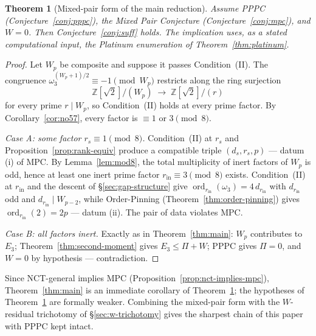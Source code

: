 \documentclass[11pt]{amsart}
\theoremstyle{plain}
\newtheorem{theorem}{Theorem}[section]
\theoremstyle{definition}
\theoremstyle{remark}
\numberwithin{equation}{section}
\newcommand{\ord}{\operatorname{ord}}
\newcommand{\Z}{\mathbb{Z}}
\begin{document}
\begin{theorem}[Mixed-pair form of the main reduction]\label{thm:main-mpc}
Assume PPPC (Conjecture~\ref{conj:pppc}), the Mixed Pair Conjecture (Conjecture~\ref{conj:mpc}), and $W = 0$. Then Conjecture~\ref{conj:suff} holds. The implication uses, as a stated computational input, the Platinum enumeration of Theorem~\ref{thm:platinum}.
\end{theorem}

\begin{proof}
Let $W_p$ be composite and suppose it passes Condition~(II). The congruence $\omega_3^{(W_p+1)/2} \equiv -1 \pmod{W_p}$ restricts along the ring surjection
\[
  \Z[\sqrt 2]/(W_p) \;\longrightarrow\; \Z[\sqrt 2]/(r)
\]
for every prime $r \mid W_p$, so Condition~(II) holds at every prime factor. By Corollary~\ref{cor:no57}, every factor is $\equiv 1$ or $3 \pmod 8$.

\emph{Case A: some factor $r_s \equiv 1 \pmod 8$.} Condition~(II) at $r_s$ and Proposition~\ref{prop:rank-equiv} produce a compatible triple $(d_s, r_s, p)$ --- datum (i) of MPC. By Lemma~\ref{lem:mod8}, the total multiplicity of inert factors of $W_p$ is odd, hence at least one inert prime factor $r_{\mathrm{in}} \equiv 3 \pmod 8$ exists. Condition~(II) at $r_{\mathrm{in}}$ and the descent of \S\ref{sec:gap-structure} give $\ord_{r_{\mathrm{in}}}(\omega_3) = 4\,d_{r_{\mathrm{in}}}$ with $d_{r_{\mathrm{in}}}$ odd and $d_{r_{\mathrm{in}}} \mid W_{p-2}$, while Order-Pinning (Theorem~\ref{thm:order-pinning}) gives $\ord_{r_{\mathrm{in}}}(2) = 2p$ --- datum (ii). The pair of data violates MPC.

\emph{Case B: all factors inert.} Exactly as in Theorem~\ref{thm:main}: $W_p$ contributes to $E_3$; Theorem~\ref{thm:second-moment} gives $E_3 \leq \Pi + W$; PPPC gives $\Pi = 0$, and $W = 0$ by hypothesis --- contradiction.
\end{proof}

Since NCT-general implies MPC (Proposition~\ref{prop:nct-implies-mpc}), Theorem~\ref{thm:main} is an immediate corollary of Theorem~\ref{thm:main-mpc}; the hypotheses of Theorem~\ref{thm:main-mpc} are formally weaker. Combining the mixed-pair form with the $W$-residual trichotomy of \S\ref{sec:w-trichotomy} gives the sharpest chain of this paper with PPPC kept intact.
\end{document}
